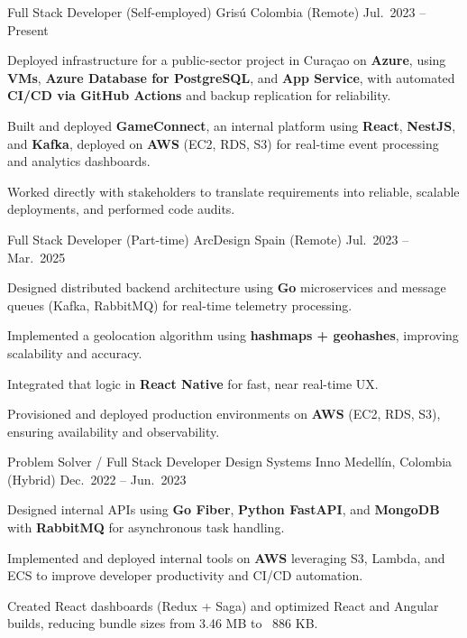 \begin{cventries}
  \cventry
  {Full Stack Developer (Self-employed)}
  {Grisú}
  {Colombia (Remote)}
  {Jul.\ 2023 -- Present}
  {
    \begin{cvitems}
      \item {Deployed infrastructure for a public-sector project in Curaçao on \textbf{Azure}, using \textbf{VMs}, \textbf{Azure Database for PostgreSQL}, and \textbf{App Service}, with automated \textbf{CI/CD via GitHub Actions} and backup replication for reliability.}
      \item {Built and deployed \textbf{GameConnect}, an internal platform using \textbf{React}, \textbf{NestJS}, and \textbf{Kafka}, deployed on \textbf{AWS} (EC2, RDS, S3) for real-time event processing and analytics dashboards.}
      \item {Worked directly with stakeholders to translate requirements into reliable, scalable deployments, and performed code audits.}
    \end{cvitems}
  }

  \cventry
  {Full Stack Developer (Part-time)}
  {ArcDesign}
  {Spain (Remote)}
  {Jul.\ 2023 -- Mar.\ 2025}
  {
    \begin{cvitems}
      \item {Designed distributed backend architecture using \textbf{Go} microservices and message queues (Kafka, RabbitMQ) for real-time telemetry processing.}
      \item {Implemented a geolocation algorithm using \textbf{hashmaps + geohashes}, improving scalability and accuracy.}
      \item {Integrated that logic in \textbf{React Native} for fast, near real-time UX.}
      \item {Provisioned and deployed production environments on \textbf{AWS} (EC2, RDS, S3), ensuring availability and observability.}
    \end{cvitems}
  }

  \cventry
  {Problem Solver / Full Stack Developer}
  {Design Systems Inno}
  {Medellín, Colombia (Hybrid)}
  {Dec.\ 2022 -- Jun.\ 2023}
  {
    \begin{cvitems}
      \item {Designed internal APIs using \textbf{Go Fiber}, \textbf{Python FastAPI}, and \textbf{MongoDB} with \textbf{RabbitMQ} for asynchronous task handling.}
      \item {Implemented and deployed internal tools on \textbf{AWS} leveraging S3, Lambda, and ECS to improve developer productivity and CI/CD automation.}
      \item {Created React dashboards (Redux + Saga) and optimized React and Angular builds, reducing bundle sizes from 3.46 MB to ~886 KB.}
    \end{cvitems}
  }


\end{cventries}
